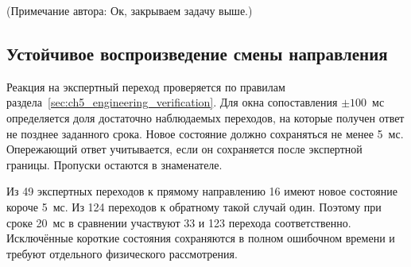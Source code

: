\iffalse
\ifdefined\AuthorReview
\par\smallskip\begingroup\small\raggedright\color{red!60!black}
\noindent\textbf{Примечание рецензента [R5-11], границы быстродействия.} Временные показатели описывают положение ответа на записанной осциллограмме. Для перехода к работающему РНМ ещё нужны период обновления, время формирования признаков и расчёта сети на выбранном устройстве, а также задержка выдачи результата. Наличие ответа на каждом отсчёте плотной сетки не доказывает возможность такого темпа вычислений. Особенно это относится к H123-D24. Достаточно зафиксировать отсутствующий этап проверки; не переносить сюда времена CPU другой серии из главы 4. Удержание 5 мс в анализе также не является измеренным временем реализации выходной логики.\par\endgroup\smallskip
\fi
\ifdefined\AuthorReview
\par{}\smallskip
\fi

(Примечание автора: Ок, закрываем задачу выше.)
\fi

\subsection{Устойчивое воспроизведение смены направления}

Реакция на экспертный переход проверяется
по правилам раздела~\ref{sec:ch5_engineering_verification}.
Для окна сопоставления $\pm100$~мс
определяется доля достаточно наблюдаемых переходов,
на которые получен ответ не позднее заданного срока.
Новое состояние должно сохраняться не менее 5~мс.
Опережающий ответ учитывается,
если он сохраняется после экспертной границы.
Пропуски остаются в знаменателе.

Из 49 экспертных переходов к прямому направлению
16 имеют новое состояние короче 5~мс.
Из 124 переходов к обратному такой случай один.
Поэтому при сроке 20~мс в сравнении участвуют
33 и 123 перехода соответственно.
Исключённые короткие состояния сохраняются
в полном ошибочном времени
и требуют отдельного физического рассмотрения.

